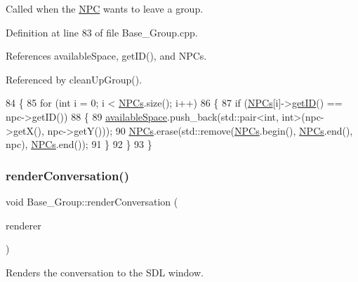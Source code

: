 Called when the \hyperlink{class_n_p_c}{N\+PC} wants to leave a group. 



Definition at line 83 of file Base\+\_\+\+Group.\+cpp.



References available\+Space, get\+I\+D(), and N\+P\+Cs.



Referenced by clean\+Up\+Group().


\begin{DoxyCode}
84 \{
85     \textcolor{keywordflow}{for} (\textcolor{keywordtype}{int} i = 0; i < \hyperlink{class_base___group_a4757f3c06c73eea029f71b871c1d863e}{NPCs}.size(); i++)
86     \{
87         \textcolor{keywordflow}{if} (\hyperlink{class_base___group_a4757f3c06c73eea029f71b871c1d863e}{NPCs}[i]->\hyperlink{class_base___group_a7299ae154b26d741ac2f6f794bc3a544}{getID}() == npc->getID())
88         \{
89             \hyperlink{class_base___group_a8eb46d3107d53da0f5fbea2410b4b095}{availableSpace}.push\_back(std::pair<int, int>(npc->getX(), npc->getY()));
90             \hyperlink{class_base___group_a4757f3c06c73eea029f71b871c1d863e}{NPCs}.erase(std::remove(\hyperlink{class_base___group_a4757f3c06c73eea029f71b871c1d863e}{NPCs}.begin(), \hyperlink{class_base___group_a4757f3c06c73eea029f71b871c1d863e}{NPCs}.end(), npc), 
      \hyperlink{class_base___group_a4757f3c06c73eea029f71b871c1d863e}{NPCs}.end());
91         \}
92     \}
93 \}
\end{DoxyCode}
\mbox{\label{class_base___group_a44b94b9d83c0aa526c9b51e2a46274cd}} 
\subsubsection{\texorpdfstring{render\+Conversation()}{renderConversation()}}
{\footnotesize\ttfamily void Base\+\_\+\+Group\+::render\+Conversation (\begin{DoxyParamCaption}\item[{S\+D\+L\+\_\+\+Renderer $\ast$}]{renderer }\end{DoxyParamCaption})}



Renders the conversation to the S\+DL window. 




